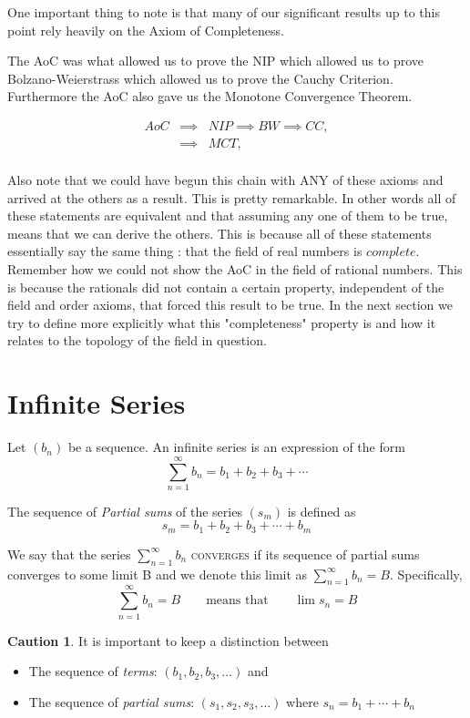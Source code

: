 \documentclass{tufte-book}
\theoremstyle{definition}
\newtheorem*{dangerousbend}{\textdbend Caution}
\numberwithin{section}{chapter}
\begin{document}
One important thing to note is that many of our significant results up to this point rely heavily on the Axiom of Completeness.

The AoC was what allowed us to prove the NIP which allowed us to prove Bolzano-Weierstrass which allowed us to prove the Cauchy Criterion.  Furthermore the AoC also gave us the Monotone Convergence Theorem.

$$
\begin{array}{rcl}
AoC &\implies & NIP \implies BW \implies CC ,\\
&\implies & MCT,\\
\end{array}
$$

Also note that we could have begun this chain with ANY of these axioms and arrived at the others as a result.  This is pretty remarkable.  In other words all of these statements are equivalent and that assuming any one of them to be true, means that we can derive the others.   This is because all of these statements essentially say the same thing : that the field of real numbers is $complete$.   Remember how we could not show the AoC in the field of rational numbers.  This is because the rationals did not contain a certain property, independent of the field and order axioms, that forced this result to be true.  In the next section we try to define more explicitly what this "completeness" property is and how it relates to the topology of the field in question.


\section{Infinite Series}


  Let $(b_n)$ be a sequence.  An infinite series is an expression of the form
		\[\sum_{n=1}^{\infty} b_n = b_1 + b_2 + b_3 + \cdots \]
		
		The sequence of \emph{Partial sums} of the series $(s_m)$ is defined as 
			\[s_m = b_1 + b_2 + b_3 + \cdots + b_m \]
			
		We say that the series $\sum_{n=1}^{\infty} b_n$ \textsc{converges} if its sequence of partial sums converges to some limit B and we denote this limit as $\sum_{n=1}^{\infty} b_n  = B$.
		Specifically,
		\[\sum_{n=1}^{\infty} b_n = B \qquad \text{means that} \qquad \lim s_n = B\]
		
		
		\begin{dangerousbend}
			It is important to keep a distinction between 
				\begin{itemize}
					\item The sequence of \emph{terms}: $(b_1, b_2, b_3, \ldots)$ and
					\item The sequence of \emph{partial sums}:  $(s_1, s_2, s_3, \ldots)$ where $s_n = b_1 +  \cdots + b_n$
				\end{itemize}
		\end{dangerousbend}
		
\end{document}
